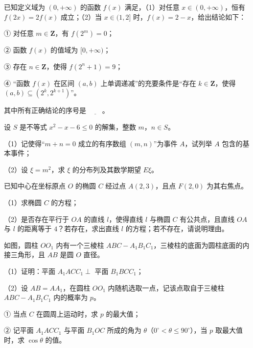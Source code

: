 \begin{question}
已知定义域为 $(0,+\infty)$ 的函数 $f(x)$ 满足，（1）对任意 $x\in(0,+\infty)$，恒有 $f(2x)=2f(x)$ 成立；（2）当 $x\in(1,2]$ 时，$f(x)=2-x$，给出结论如下：

① 对任意 $m\in\mathbf Z$，有 $f(2^m)=0$；

② 函数 $f(x)$ 的值域为 $[0,+\infty)$；

③ 存在 $n\in\mathbf Z$，使得 $f(2^n+1)=9$；

④ “函数 $f(x)$ 在区间 $(a,b)$ 上单调递减”的充要条件是“存在 $k\in\mathbf Z$，使得 $(a,b)\subseteq\left(2^k,2^{k+1}\right)$”。

其中所有正确结论的序号是 $\underline{\qquad}$。

\end{question}
\begin{question}
设 $S$ 是不等式 $x^2-x-6\leqslant0$ 的解集，整数 $m$，$n\in S$。

（1）记使得“$m+n=0$ 成立的有序数组 $(m,n)$”为事件 $A$，试列举 $A$ 包含的基本事件；

（2）设 $\xi=m^2$，求 $\xi$ 的分布列及其数学期望 $E\xi$。

\end{question}
\begin{question}
已知中心在坐标原点 $O$ 的椭圆 $C$ 经过点 $A(2,3)$，且点 $F(2,0)$ 为其右焦点。

（1）求椭圆 $C$ 的方程；

（2）是否存在平行于 $OA$ 的直线 $l$，使得直线 $l$ 与椭圆 $C$ 有公共点，且直线 $OA$ 与 $l$ 的距离等于 $4$？若存在，求出直线 $l$ 的方程；若不存在，请说明理由。

\Needspace{0.4\textheight}
\end{question}
\begingroup
\renewenvironment{question}{\Needspace{0.5\textheight}}{}
\begin{question}
如图，圆柱 $OO_1$ 内有一个三棱柱 $ABC-A_1B_1C_1$，三棱柱的底面为圆柱底面的内接三角形，且 $AB$ 是圆 $O$ 直径。

（1）证明：平面 $A_1ACC_1\perp$ 平面 $B_1BCC_1$；

（2）设 $AB=AA_1$，在圆柱 $OO_1$ 内随机选取一点，记该点取自于三棱柱 $ABC-A_1B_1C_1$ 内的概率为 $p$。

① 当点 $C$ 在圆周上运动时，求 $p$ 的最大值；

② 记平面 $A_1ACC_1$ 与平面 $B_1OC$ 所成的角为 $\theta$（$0^\circ<\theta\leqslant90^\circ$），当 $p$ 取最大值时，求 $\cos\theta$ 的值。
\nopagebreak[4]
\begin{center}\end{center}
\nopagebreak[4]
\end{question}
